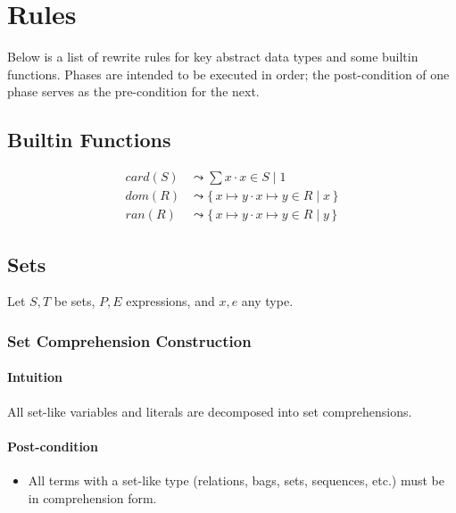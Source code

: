\documentclass{article}
\newcommand{\bSet}[3]{%
  \{\, #1 \cdot #2 \mid #3 \, \}%
}
\begin{document}
\section{Rules}
Below is a list of rewrite rules for key abstract data types and some builtin functions. Phases are intended to be executed in order; the post-condition of one phase serves as the pre-condition for the next.
\subsection{Builtin Functions}

\noindent\begin{minipage}{\linewidth}
\begin{align}
  \tag{Cardinality}
  card(S)
  &\leadsto
  \sum x \cdot x \in S \mid 1
  \\
  \tag{Domain}
  dom(R)
  &\leadsto
  \bSet{x \mapsto y}{x \mapsto y \in R}{x}
  \\
  \tag{Range}
  ran(R)
  &\leadsto
  \bSet{x \mapsto y}{x \mapsto y \in R}{y}
\end{align}
\end{minipage}
\subsection{Sets}

Let $S,T$ be sets, $P, E$ expressions, and $x, e$ any type.
\subsubsection{Set Comprehension Construction}

\paragraph{Intuition} All set-like variables and literals are decomposed into set comprehensions.

\paragraph{Post-condition}
\begin{itemize}
  \item All terms with a set-like type (relations, bags, sets, sequences, etc.) must be in comprehension form.
\end{itemize}
\end{document}
